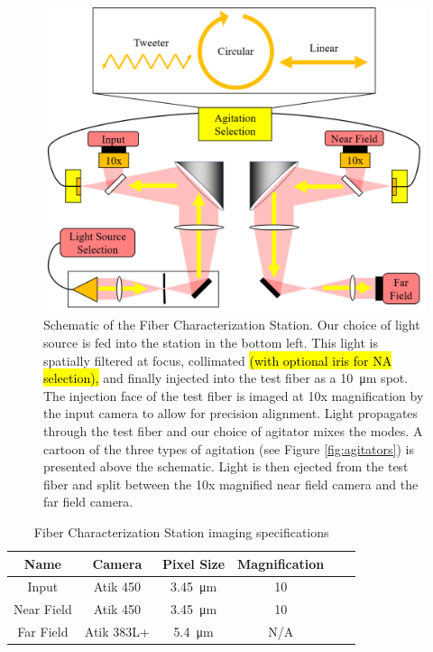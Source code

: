 \documentclass[twocolumn]{emulateapj}
\begin{document}
\begin{figure}
\centering
	\includegraphics[width=\columnwidth]{images/fcs_schematic.pdf}
	\caption{Schematic of the Fiber Characterization Station. Our choice of light source is fed into the station in the bottom left. This light is spatially filtered at focus, collimated \hl{(with optional iris for NA selection),} and finally injected into the test fiber as a \SI{10}{\micro\meter} spot. The injection face of the test fiber is imaged at 10x magnification by the input camera to allow for precision alignment. Light propagates through the test fiber and our choice of agitator mixes the modes. A cartoon of the three types of agitation (see Figure \ref{fig:agitators}) is presented above the schematic. Light is then ejected from the test fiber and split between the 10x magnified near field camera and the far field camera.}
\label{fig:fcs}
\end{figure}

\begin{table}
\centering
\caption{Fiber Characterization Station imaging specifications}
	\begin{tabular}{cccccc}
	\hline
	Name & Camera & Pixel Size & Magnification \\
	\hline \hline
	Input & Atik 450 & \SI{3.45}{\micro\meter} & 10 \\
	\hline
	Near Field & Atik 450 & \SI{3.45}{\micro\meter} & 10 \\
	\hline
	Far Field & Atik 383L+ & \SI{5.4}{\micro\meter} & N/A \\
	\hline	
	\end{tabular}
\label{table:cameras}
\end{table}
\end{document}
